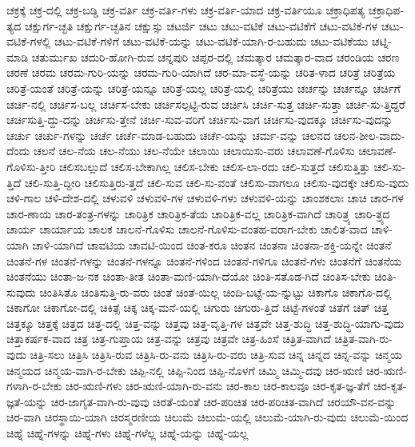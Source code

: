 {ಚಕ್ರಕ್ಕೆ
ಚಕ್ರ-ದಲ್ಲಿ
ಚಕ್ರ-ಬಡ್ಡಿ
ಚಕ್ರ-ವರ್ತಿ
ಚಕ್ರ-ವರ್ತಿ-ಗಳು
ಚಕ್ರ-ವರ್ತಿ-ಯಾದ
ಚಕ್ರ-ವರ್ತಿಯೂ
ಚಕ್ರಾಧಿಪತ್ಯ
ಚಕ್ರಾಧಿಪ-ತ್ಯದ
ಚಕ್ಷುರ್ಗ-ಚ್ಛತಿ
ಚಕ್ಷುರ್ಗ-ಚ್ಛತಿನ
ಚಕ್ಷುಸ್ಸು
ಚಟರ್ಜಿ
ಚಟು
ಚಟು-ವಟಿಕೆ
ಚಟು-ವಟಿಕೆಗೆ
ಚಟು-ವಟಿಕೆ-ಗಳ
ಚಟು-ವಟಿಕೆ-ಗಳಲ್ಲಿ
ಚಟು-ವಟಿಕೆ-ಗಳಿಗೆ
ಚಟು-ವಟಿಕೆ-ಯನ್ನು
ಚಟು-ವಟಿಕೆ-ಯಾಗಿ-ರ-ಬಹುದು
ಚಟು-ವಟಿಕೆಯು
ಚಟ್ನಿ-ಮಾಡಿ
ಚತುರ್ಮುಖ
ಚದುರಿ-ಹೋಗಿ-ರುವ
ಚನ್ನಪುರಿ
ಚಪ್ಪರ-ದಲ್ಲಿ
ಚಮತ್ಕಾರ
ಚಮತ್ಕಾರ-ವಾದ
ಚರಂಡಿಯ
ಚರಣ
ಚರಣೆ
ಚರಮ
ಚರಮ-ಗುರಿ-ಯನ್ನು
ಚರಮ-ಗುರಿ-ಯಾಗಿದೆ
ಚರ-ಮಾ-ವಸ್ಥೆ-ಯನ್ನು
ಚರಿತ-ಳಾದ
ಚರಿತ್ರೆ
ಚರಿತ್ರೆಯ
ಚರಿತ್ರೆ-ಯಂತೆ
ಚರಿತ್ರೆ-ಯನ್ನು
ಚರಿತ್ರೆ-ಯನ್ನೂ
ಚರಿತ್ರೆ-ಯಲ್ಲ
ಚರಿತ್ರೆ-ಯಲ್ಲಿ
ಚರಿತ್ರೆಯು
ಚರ್ಚನ್ನು
ಚರ್ಚನ್ನೂ
ಚರ್ಚಿಗೆ
ಚರ್ಚಿ-ನಲ್ಲಿ
ಚರ್ಚಿಸ-ಬಲ್ಲ
ಚರ್ಚಿಸ-ಬೇಕು
ಚರ್ಚಿಸಲ್ಪಟ್ಟಿ-ರುವ
ಚರ್ಚಿಸಿ
ಚರ್ಚಿ-ಸುತ್ತ
ಚರ್ಚಿ-ಸುತ್ತಾ
ಚರ್ಚಿ-ಸು-ತ್ತಿದ್ದರೆ
ಚರ್ಚಿಸುತ್ತಿ-ದ್ದು-ದನ್ನು
ಚರ್ಚಿಸು-ತ್ತೇನೆ
ಚರ್ಚಿ-ಸುವ-ವರಿಗೆ
ಚರ್ಚಿಸು-ವಾಗ
ಚರ್ಚಿಸು-ವುದಕ್ಕೂ
ಚರ್ಚಿಸು-ವುದನ್ನು
ಚರ್ಚು
ಚರ್ಚು-ಗಳನ್ನು
ಚರ್ಚೆ
ಚರ್ಚೆ-ಮಾಡ-ಬಹುದು
ಚರ್ಚೆ-ಯನ್ನು
ಚರ್ಮ-ವನ್ನು
ಚಲನದ
ಚಲನ-ಶೀಲ-ವಾದು-ದೆಂದು
ಚಲನೆ
ಚಲ-ನೆಯ
ಚಲ-ನೆಯು
ಚಲ-ನೆಯೇ
ಚಲಾಯಿ
ಚಲಾಯಿಸು-ವರು
ಚಲಾವಣೆ-ಗೊಳಿಸು
ಚಲಾವಣೆ-ಗೊಳಿಸು-ತ್ತೀರಿ
ಚಲಿಸಬಲ್ಲುದೆ
ಚಲಿಸ-ಬೇಕಾಗಿಲ್ಲ
ಚಲಿಸ-ಬೇಕು
ಚಲಿಸ-ಲಾ-ರದು
ಚಲಿ-ಸುತ್ತದೆ
ಚಲಿಸುತ್ತಿತ್ತು
ಚಲಿ-ಸು-ತ್ತಿದೆ
ಚಲಿ-ಸುತ್ತಿ-ದ್ದೀರಿ
ಚಲಿಸುತ್ತಿರು-ತ್ತದೆ
ಚಲಿ-ಸುವ
ಚಲಿ-ಸು-ವಂತೆ
ಚಲಿಸು-ವಾಗಲೂ
ಚಲಿಸು-ವುದಕ್ಕೇ
ಚಲಿಸು-ವುದು
ಚಳಿ-ಗಾಲ
ಚಳಿ-ದೇಶ-ದಲ್ಲಿ
ಚಳುವಳಿ
ಚಳುವಳಿ-ಗಳ
ಚಳುವಳಿ-ಗಳು
ಚಳುವಳಿ-ಯನ್ನು
ಚಾಂಶಕಲಾಃ
ಚಾಚಿ
ಚಾರ-ಗಳ
ಚಾರ-ಣಾಯ
ಚಾರ-ತಂತ್ರ-ಗಳನ್ನು
ಚಾರಿತ್ರಿಕ
ಚಾರಿತ್ರಿಕ-ತೆಯ
ಚಾರಿತ್ರಿಕ-ವಲ್ಲ
ಚಾರಿತ್ರಿಕ-ವಾಗಿದೆ
ಚಾರಿತ್ರ್ಯ
ಚಾರಿ-ತ್ರ್ಯದ
ಚಾರ್ಯ
ಚಾರ್ಯಾಯ
ಚಾಲಕ
ಚಾಲನೆ-ಗೊಳಿಸು
ಚಾಲನೆ-ಗೊಳಿಸು-ವಂತಹ-ವರಾಗ-ಬೇಕು
ಚಾಲಿತ-ವಾದ
ಚಾಳಿ-ಯಾಗಿ
ಚಾಳಿ-ಯಾಗಿದೆ
ಚಾವಟಿಯ
ಚಾವಟಿ-ಯಿಂದ
ಚಿಂತ-ಕರೂ
ಚಿಂತನ
ಚಿಂತನಾ
ಚಿಂತನಾ-ಶಕ್ತಿ-ಯನ್ನೇ
ಚಿಂತನೆ
ಚಿಂತನೆ-ಗಳ
ಚಿಂತನೆ-ಗಳನ್ನು
ಚಿಂತನೆ-ಗಳನ್ನೂ
ಚಿಂತನೆ-ಗಳಿಂದ
ಚಿಂತನೆ-ಗಳಿಗೂ
ಚಿಂತನೆ-ಗಳು
ಚಿಂತನೆಗೆ
ಚಿಂತನೆಯ
ಚಿಂತನೆಯು
ಚಿಂತಾ-ಜ-ನಕ
ಚಿಂತಾ-ತೀತ
ಚಿಂತಾ-ಮಣಿ-ಯಾಗಿ-ದೆಯೋ
ಚಿಂತಿ-ಸತೊಡ-ಗಿದೆ
ಚಿಂತಿಸ-ಬೇಕು
ಚಿಂತಿ-ಸುವುದು
ಚಿಂತಿಸಿತೊ
ಚಿಂತಿಸುತ್ತಿ-ರು-ವರು
ಚಿಂತೆ
ಚಿಂತೆ-ಯಿಲ್ಲ
ಚಿಂದಿ-ಬಟ್ಟೆ-ಯ-ನ್ನುಟ್ಟು
ಚಿಕಾಗೊ
ಚಿಕಾಗೊ-ದಲ್ಲಿ
ಚಿಕಾಗೋ
ಚಿಕಾಗೋ-ದಲ್ಲಿ
ಚಿಕಿತ್ಸೆ
ಚಿಕ್ಕ
ಚಿಕ್ಕ-ಮನೆ-ಯಲ್ಲಿ
ಚಿಗುರು
ಚಿಗುರು-ತ್ತಿದೆ
ಚಿಟ್ಟೆ-ಗಳಂತೆ
ಚಿತೆಗೆ
ಚಿತ್
ಚಿತ್ತ
ಚಿತ್ತಕ್ಕೂ
ಚಿತ್ತಕ್ಕೆ
ಚಿತ್ತದ
ಚಿತ್ತ-ದಲ್ಲಿ
ಚಿತ್ತ-ವನ್ನು
ಚಿತ್ತವು
ಚಿತ್ತ-ವೃತ್ತಿ-ಗಳ
ಚಿತ್ತವೇ
ಚಿತ್ತ-ಶುದ್ಧಿ
ಚಿತ್ತ-ಶುದ್ಧಿ-ಯಾಗು-ವುದು
ಚಿತ್ತಾಕರ್ಷಕ-ವಾದ
ಚಿತ್ರ
ಚಿತ್ರ-ಗುಪ್ತಾಯ
ಚಿತ್ರ-ವನ್ನು
ಚಿತ್ರವು
ಚಿತ್ರವೇ
ಚಿತ್ರ-ಹಿಂಸೆ
ಚಿತ್ರಿತ-ವಾಗಿದೆ
ಚಿತ್ರಿತ-ವಾಗಿ-ರು-ವುದು
ಚಿತ್ರಿ-ಸಲು
ಚಿತ್ರಿಸಿ
ಚಿತ್ರಿಸಿ-ರುವ
ಚಿತ್ರಿಸಿ-ರು-ವನು
ಚಿತ್ರಿಸಿ-ರು-ವರು
ಚಿತ್ರಿ-ಸುವ
ಚಿನ್ನ
ಚಿನ್ನದ
ಚಿನ್ನ-ವನ್ನು
ಚಿನ್ಮಯ
ಚಿನ್ಮಯದ
ಚಿನ್ಮಯ-ವಾಗಿ-ರ-ಬೇಕು
ಚಿಪ್ಪಿ-ನಲ್ಲಿ
ಚಿಪ್ಪಿ-ನಿಂದ
ಚಿಪ್ಪಿ-ನೊಳಗೆ
ಚಿಮ್ಮಿ
ಚಿಮ್ಮಿ-ದವು
ಚಿರ-ಋಣಿ
ಚಿರ-ಋಣಿ-ಗಳಾಗಿ-ರ-ಬೇಕು
ಚಿರ-ಋಣಿ-ಗಳು
ಚಿರ-ಋಣಿ-ಯಾಗಿ-ರು-ವನು
ಚಿರ-ಕಾಲ
ಚಿರ-ಕಾಲವೂ
ಚಿರ-ಕೃತ-ಜ್ಞ-ತೆಗೆ
ಚಿರ-ಕೃತ-ಜ್ಞತೆ-ಯನ್ನು
ಚಿರ-ಜಾಗೃತ-ವಾಗಿ-ರು-ವುವು
ಚಿರತೆ-ಯಂತೆ
ಚಿರ-ಪರಿಚಿತ
ಚಿರ-ಪರಿಚಿತ-ವಾಗಿದೆ
ಚಿರಯೌ-ವನ-ವನ್ನು
ಚಿರ-ವಾಗಿ
ಚಿರಸ್ಥಾಯಿ-ಯಾಗಿ
ಚಿರಸ್ಮರಣೀಯ
ಚಿಲುಮೆ
ಚಿಲುಮೆ-ಯಲ್ಲಿ
ಚಿಲುಮೆ-ಯಾಗಿ-ರು-ವುದು
ಚಿಲುಮೆ-ಯಿಂದ
ಚಿಹ್ನೆ
ಚಿಹ್ನೆ-ಗಳನ್ನು
ಚಿಹ್ನೆ-ಗಳು
ಚಿಹ್ನೆ-ಗಳೆಲ್ಲ
ಚಿಹ್ನೆ-ಯನ್ನು
ಚಿಹ್ನೆ-ಯಲ್ಲ
}
